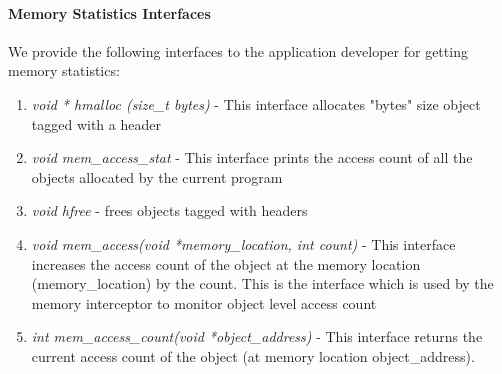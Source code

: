 \paragraph{Memory Statistics Interfaces}
We provide the following interfaces to the application developer for getting memory statistics:
\begin{enumerate}
\item {\emph{void * hmalloc (size\_t bytes)}} - This interface allocates "bytes" size object tagged with a header
\item {\emph{void mem\_access\_stat}} - This interface prints the access count of all the objects allocated by the current program
\item {\emph{void hfree}} - frees objects tagged with headers
\item{\emph{void mem\_access(void *memory\_location, int count)}} - This interface increases the access count of the object at the memory location (memory\_location) by the count. This is the interface which is used by the memory interceptor to monitor object level access count
\item {\emph{int mem\_access\_count(void *object\_address)}} - This interface returns the current access count of the object (at memory location object\_address).
\end{enumerate}
